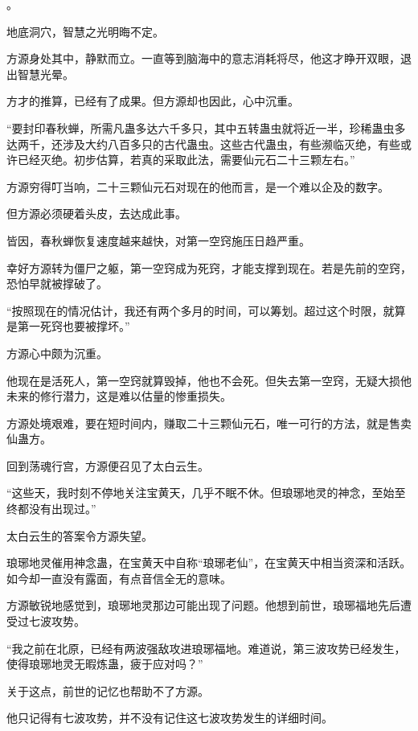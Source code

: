 
\begin{this_body}



。

地底洞穴，智慧之光明晦不定。

方源身处其中，静默而立。一直等到脑海中的意志消耗将尽，他这才睁开双眼，退出智慧光晕。

方才的推算，已经有了成果。但方源却也因此，心中沉重。

“要封印春秋蝉，所需凡蛊多达六千多只，其中五转蛊虫就将近一半，珍稀蛊虫多达两千，还涉及大约八百多只的古代蛊虫。这些古代蛊虫，有些濒临灭绝，有些或许已经灭绝。初步估算，若真的采取此法，需要仙元石二十三颗左右。”

方源穷得叮当响，二十三颗仙元石对现在的他而言，是一个难以企及的数字。

但方源必须硬着头皮，去达成此事。

皆因，春秋蝉恢复速度越来越快，对第一空窍施压日趋严重。

幸好方源转为僵尸之躯，第一空窍成为死窍，才能支撑到现在。若是先前的空窍，恐怕早就被撑破了。

“按照现在的情况估计，我还有两个多月的时间，可以筹划。超过这个时限，就算是第一死窍也要被撑坏。”

方源心中颇为沉重。

他现在是活死人，第一空窍就算毁掉，他也不会死。但失去第一空窍，无疑大损他未来的修行潜力，这是难以估量的惨重损失。

方源处境艰难，要在短时间内，赚取二十三颗仙元石，唯一可行的方法，就是售卖仙蛊方。

回到荡魂行宫，方源便召见了太白云生。

“这些天，我时刻不停地关注宝黄天，几乎不眠不休。但琅琊地灵的神念，至始至终都没有出现过。”

太白云生的答案令方源失望。

琅琊地灵催用神念蛊，在宝黄天中自称“琅琊老仙”，在宝黄天中相当资深和活跃。如今却一直没有露面，有点音信全无的意味。

方源敏锐地感觉到，琅琊地灵那边可能出现了问题。他想到前世，琅琊福地先后遭受过七波攻势。

“我之前在北原，已经有两波强敌攻进琅琊福地。难道说，第三波攻势已经发生，使得琅琊地灵无暇炼蛊，疲于应对吗？”

关于这点，前世的记忆也帮助不了方源。

他只记得有七波攻势，并不没有记住这七波攻势发生的详细时间。


\end{this_body}
